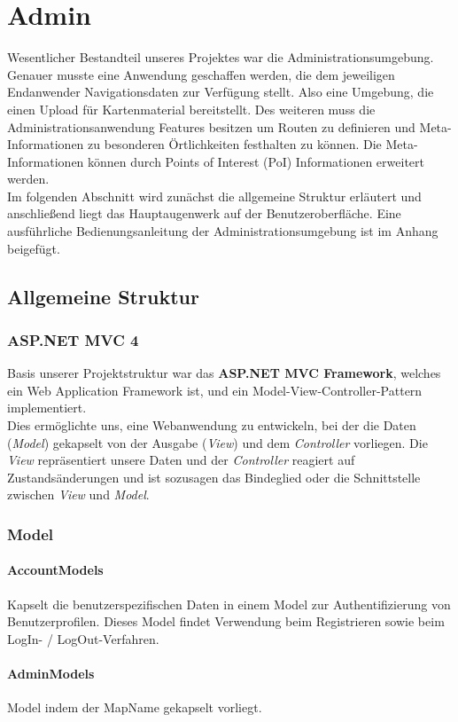\chapter{Admin}
Wesentlicher Bestandteil unseres Projektes war die Administrationsumgebung. Genauer musste eine Anwendung geschaffen werden, die dem jeweiligen Endanwender Navigationsdaten zur Verfügung stellt. Also eine Umgebung, die einen Upload für Kartenmaterial bereitstellt. Des weiteren muss die Administrationsanwendung Features besitzen um Routen zu definieren und Meta-Informationen zu besonderen Örtlichkeiten festhalten zu können. Die Meta-Informationen können durch Points of Interest (PoI) Informationen erweitert werden.\\
Im folgenden Abschnitt wird zunächst die allgemeine Struktur erläutert und anschließend liegt das Hauptaugenwerk auf der Benutzeroberfläche. Eine ausführliche Bedienungsanleitung der Administrationsumgebung ist im Anhang beigefügt.

\section{Allgemeine Struktur}
\subsection*{ASP.NET MVC 4}
Basis unserer Projektstruktur war das \textbf{ASP.NET MVC Framework}, welches ein Web Application Framework ist, und ein Model-View-Controller-Pattern implementiert.\\
Dies ermöglichte uns, eine Webanwendung zu entwickeln, bei der die Daten (\textit{Model}) gekapselt von der Ausgabe (\textit{View}) und dem \textit{Controller} vorliegen. Die \textit{View} repräsentiert unsere Daten und der \textit{Controller} reagiert auf Zustandsänderungen und ist sozusagen das Bindeglied oder die Schnittstelle zwischen \textit{View} und \textit{Model}.

\subsection{Model}
\subsubsection*{AccountModels}
Kapselt die benutzerspezifischen Daten in einem Model zur Authentifizierung von Benutzerprofilen. Dieses Model findet Verwendung beim Registrieren sowie beim LogIn- / LogOut-Verfahren.
\subsubsection*{AdminModels}
Model indem der MapName gekapselt vorliegt.
